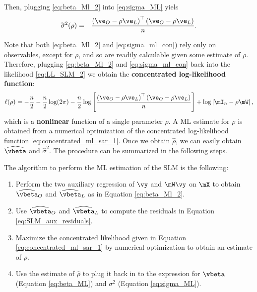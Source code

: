 \documentclass[english,12pt]{book}\usepackage[]{graphicx}\usepackage[]{xcolor}
\begin{document}
Then, plugging \eqref{eq:beta_Ml_2} into \eqref{eq:sigma_ML} yiels
\begin{eqnarray}\label{eq:sigma_ml_con}
\widetilde{\sigma}^2(\rho) &=& \frac{\left(\ve_O - \rho\ve_L\right)^\top\left(\ve_O - \rho\ve_L\right)}{n}.
\end{eqnarray}

Note that both \eqref{eq:beta_Ml_2} and \eqref{eq:sigma_ml_con}) rely only on observables, except for $\rho$, and so are readily calculable given some estimate of $\rho$. Therefore, plugging \eqref{eq:beta_Ml_2} and \eqref{eq:sigma_ml_con} back into the likelihood \eqref{eq:LL_SLM_2}  we obtain the \textbf{concentrated log-likelihood function}:
\begin{equation}\label{eq:concentrated_ml_sar_1}
\ell(\rho)=-\frac{n}{2}-\frac{n}{2}\log(2\pi) - \frac{n}{2}\log\left[\frac{\left(\ve_O - \rho\ve_L\right)^\top\left(\ve_O - \rho\ve_L\right)}{n}\right] + \log\left|\mI_n - \rho\mW\right|,
\end{equation}	
%	
which is a \textbf{nonlinear} function of a single parameter $\rho$. A ML estimate for $\rho$ is obtained from a numerical optimization of the concentrated log-likelihood function \eqref{eq:concentrated_ml_sar_1}. Once we obtain $\widehat{\rho}$, we can easily obtain $\widehat{\vbeta}$ and $\widehat{\sigma}^2$.  The procedure can be summarized in the following steps.

\begin{algorithm}\label{algorithm:SLM}
The algorithm to perform the ML estimation of the SLM is the following: 
\begin{enumerate}
	\item Perform the two auxiliary regression of $\vy$ and $\mW\vy$ on $\mX$ to obtain $\widehat{\vbeta}_O$ and $\widehat{\vbeta}_L$ as in Equation \eqref{eq:beta_Ml_2}.
	\item Use $\widehat{\vbeta}_O$ and $\widehat{\vbeta}_L$ to compute the residuals in Equation \eqref{eq:SLM_aux_residuals}. 
	\item Maximize the concentrated likelihood given in Equation \eqref{eq:concentrated_ml_sar_1} by numerical optimization to obtain an estimate of $\rho$.
	\item Use the estimate of $\widehat{\rho}$ to plug it back in to the expression for $\vbeta$ (Equation \ref{eq:beta_ML}) and $\sigma^2$	 (Equation \ref{eq:sigma_ML}).
\end{enumerate}	
\end{algorithm}
\end{document}
